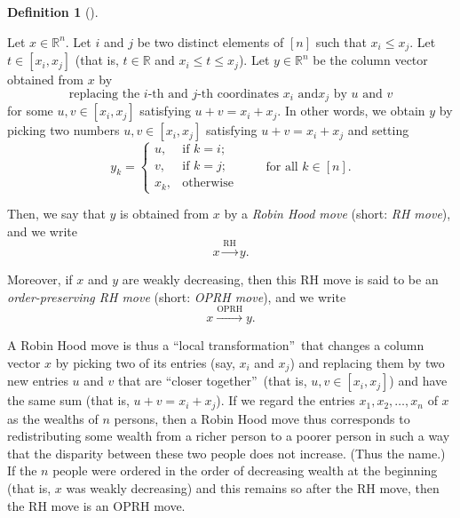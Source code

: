 \documentclass[numbers=enddot,12pt,final,onecolumn,notitlepage]{scrartcl}%
\numberwithin{exer}{subsection}
\theoremstyle{definition}
\newtheorem{defi}[theo]{Definition}
\newenvironment{definition}[1][]
{\begin{defi}[#1]\begin{leftbar}}
{\end{leftbar}\end{defi}}
\begin{document}
\begin{definition}
\label{def.major.RH}Let $x\in\mathbb{R}^{n}$. Let $i$ and $j$ be two distinct
elements of $\left[  n\right]  $ such that $x_{i}\leq x_{j}$. Let $t\in\left[
x_{i},x_{j}\right]  $ (that is, $t\in\mathbb{R}$ and $x_{i}\leq t\leq x_{j}$).
Let $y\in\mathbb{R}^{n}$ be the column vector obtained from $x$ by%
\[
\text{replacing the }i\text{-th and }j\text{-th coordinates }x_{i}\text{ and
}x_{j}\text{ by }u\text{ and }v
\]
for some $u,v\in\left[  x_{i},x_{j}\right]  $ satisfying $u+v=x_{i}+x_{j}$. In
other words, we obtain $y$ by picking two numbers $u,v\in\left[  x_{i}%
,x_{j}\right]  $ satisfying $u+v=x_{i}+x_{j}$ and setting%
\[
y_{k}=%
\begin{cases}
u, & \text{if }k=i;\\
v, & \text{if }k=j;\\
x_{k}, & \text{otherwise}%
\end{cases}
\ \ \ \ \ \ \ \ \ \ \text{for all }k\in\left[  n\right]  .
\]


Then, we say that $y$ is obtained from $x$ by a \emph{Robin Hood move} (short:
\emph{RH move}), and we write
\[
x\overset{\text{RH}}{\longrightarrow}y.
\]


Moreover, if $x$ and $y$ are weakly decreasing, then this RH move is said to
be an \emph{order-preserving RH move} (short: \emph{OPRH move}), and we write
\[
x\overset{\text{OPRH}}{\longrightarrow}y.
\]

\end{definition}

A Robin Hood move is thus a \textquotedblleft local
transformation\textquotedblright\ that changes a column vector $x$ by picking
two of its entries (say, $x_{i}$ and $x_{j}$) and replacing them by two new
entries $u$ and $v$ that are \textquotedblleft closer
together\textquotedblright\ (that is, $u,v\in\left[  x_{i},x_{j}\right]  $)
and have the same sum (that is, $u+v=x_{i}+x_{j}$). If we regard the entries
$x_{1},x_{2},\ldots,x_{n}$ of $x$ as the wealths of $n$ persons, then a Robin
Hood move thus corresponds to redistributing some wealth from a richer person
to a poorer person in such a way that the disparity between these two people
does not increase. (Thus the name.) If the $n$ people were ordered in the
order of decreasing wealth at the beginning (that is, $x$ was weakly
decreasing) and this remains so after the RH move, then the RH move is an OPRH move.
\end{document}
